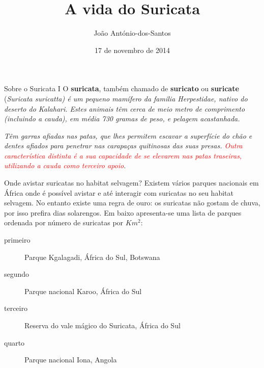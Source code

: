 \documentclass[11pt]{beamer}
\author{Jo\~ao António-dos-Santos}
\date{17 de novembro de 2014}
\title{A vida do Suricata}
\begin{document}
\begin{frame}
\maketitle
\end{frame}

\begin{frame}{Sobre o Suricata I}
O \textbf{suricata}, também chamado de \textbf{suricato} ou \textbf{suricate} (\textit{Suricata
suricatta) é um pequeno mamífero da familia Herpestidae, nativo do
deserto do Kalahari. Estes animais têm cerca de meio metro de
comprimento (incluindo a cauda), em média 730 gramas de peso, e
pelagem acastanhada.}

\textit{Têm garras afiadas nas patas, que lhes permitem escavar a superfície do
ch\~ao e dentes afiados para penetrar nas carapaças quitinosas das suas
presas. \textcolor{red} {Outra característica distinta é a sua capacidade de se elevarem nas patas traseiras, utilizando a cauda como terceiro apoio}.}
\end{frame}


\begin{frame}{Onde avistar suricatas no habitat selvagem?}
Existem vários parques nacionais em África onde é possível avistar e até interagir com suricatas no seu habitat selvagem. No entanto existe uma
regra de ouro: os suricatas n\~ao gostam de chuva, por isso prefira dias
solarengos. Em baixo apresenta-se uma lista de parques ordenada por
número de suricatas por $Km^2$:
\vspace{1cm}

\begin{description}
\item[primeiro]Parque Kgalagadi, África do Sul, Botswana
\item[segundo]Parque nacional Karoo, África do Sul
\item[terceiro]Reserva do vale mágico do Suricata, África do Sul
\item[quarto]Parque nacional Iona, Angola
\end{description}
\end{frame}
\end{document}
